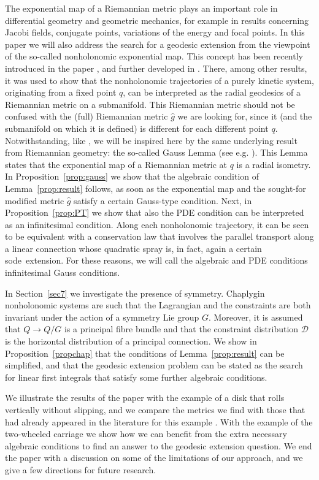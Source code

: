 \documentclass[11pt]{article}
\def\sode{{\sc sode}}
\def\D{{\mathcal D}}
\begin{document}
 The exponential map of a Riemannian metric  plays an important role in differential geometry and geometric mechanics, for example in results concerning Jacobi fields, conjugate points, variations of the energy and focal points. In this paper we will also address the search for a geodesic extension from the viewpoint of the so-called nonholonomic exponential map. This concept has been recently introduced in the paper \cite{firstnonholexp}, and further developed in \cite{Simoes}. There, among other results, it was used to show that the nonholonomic trajectories of a purely kinetic system, originating from a fixed point $q$, can be interpreted as the radial geodesics of a Riemannian metric on a submanifold. This Riemannian metric should not be confused with the (full) Riemannian metric $\hat g$ we are looking for, since it (and the submanifold on which it is defined) is different for each different point $q$. Notwithstanding, like \cite{Simoes}, we will be inspired here by the same underlying result from Riemannian geometry: the so-called Gauss Lemma (see e.g. \cite{do}). This Lemma states that the exponential map of a Riemannian metric at $q$  is  a radial isometry. In Proposition~\ref{prop:gauss} we show that the algebraic condition of Lemma~\ref{prop:result} follows, as soon as the exponential map and the sought-for modified metric $\hat g$ satisfy a certain Gauss-type condition.  Next, in Proposition~\ref{prop:PT} we show that also the PDE condition can be interpreted as an infinitesimal condition. Along each nonholonomic trajectory, it can be seen to be equivalent with a conservation law that involves the parallel transport along a linear connection whose quadratic spray is, in fact, again a certain \sode\ extension.  For these reasons, we will call the algebraic and PDE conditions   infinitesimal Gauss conditions.

In Section~\ref{sec7} we investigate the presence of symmetry. Chaplygin nonholonomic systems are such that the Lagrangian and the constraints are both invariant under the action of a symmetry Lie group $G$. Moreover, it is assumed that $Q\to Q/G$ is a principal fibre bundle and that the constraint distribution $\D$ is the horizontal distribution of a principal connection. We show in Proposition~\ref{propchap} that the conditions of Lemma~\ref{prop:result} can be simplified, and that the geodesic extension problem can be stated as the search for linear first integrals that satisfy some further algebraic conditions.  


We illustrate the results of the paper with the example of a disk that rolls vertically without slipping, and we compare the metrics we find with those that had already appeared in the literature for this example \cite{Simoes,recent,FB,BFM}.  With the example of the two-wheeled carriage we show how we can benefit from the extra necessary algebraic conditions to find an answer to the geodesic extension question. We end the paper with a discussion on some of the limitations of our approach, and we give a few directions for future research.
 
\end{document}
